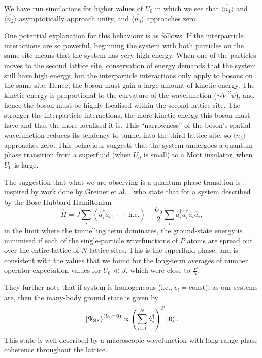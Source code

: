 \documentclass[prb, twocolumn, final]{revtex4-1}
\theoremstyle{plain}
\begin{document}
We have run simulations for higher values of $U_{0}$ in which we see that
$\overline{\langle n_{1} \rangle}$ and $\overline{\langle n_{2} \rangle}$
asymptotically approach unity, and $\overline{\langle n_{3} \rangle}$ approaches
zero.

One potential explanation for this behaviour is as follows. If the interparticle
interactions are so powerful, beginning the system with both particles on
the same site means that the system has very high energy. When one of the
particles moves to the second lattice site, conservation of energy demands
that the system still have high energy, but the interparticle interactions
only apply to bosons on the same site. Hence, the boson must gain a large
amount of kinetic energy. The kinetic energy is proportional to the
curvature of the wavefunction ($\sim \nabla^2\psi$), and hence the boson must be
highly localised within the second lattice site. The stronger the interparticle
interactions, the more kinetic energy this boson must have and thus the more
localised it is. This ``narrowness'' of the boson's spatial wavefunction
reduces its tendency to tunnel into the third lattice site, so
$\overline{\langle n_{3} \rangle}$ approaches zero. This behaviour suggests
that the system undergoes a quantum phase transition from a superfluid (when
$U_{0}$ is small) to a Mott insulator, when $U_{0}$ is large.

The suggestion that what we are observing is a quantum phase transition is
inspired by work done by Greiner et al. \cite{Greiner2002},
who state that for a system described by the Bose-Hubbard Hamiltonian
\begin{equation*}
    \hat{H}
    =
    J \sum_{i}{(\hat{a}^\dagger_{i}\hat{a}_{i+1} + \text{h.c.})} +
    \frac{U_{0}}{2}
    \sum_{i}{\hat{a}^{\dagger}_{i} \hat{a}^{\dagger}_{i} \hat{a}_{i} \hat{a}_{i}},
\end{equation*}
in the limit where the tunnelling term dominates, the ground-state energy is
minimised if each of the single-particle wavefunctions of $P$ atoms are spread
out over the entire lattice of $N$ lattice sites. This is the superfluid phase,
and is consistent with the values that we found for the long-term averages of
number operator expectation values for $U_{0} \ll J$, which were close to
$\frac{P}{N}$.

They further note that if system is homogeneous (i.e., $\epsilon_{i} =
\text{const}$), as our systems are, then the many-body ground state is given by
\begin{equation}
    \ket{\Psi_{\text{SF}}}^{ \left ( U_{0} = 0 \right)}
    \propto
    \left ( \sum_{i=1}^{N}{\hat{a}_{i}^{\dagger}} \right )^{P}
    \ket{0}.
\end{equation}
This state is well described by a macroscopic wavefunction with long range
phase coherence throughout the lattice.
\end{document}
